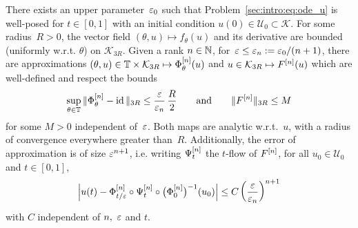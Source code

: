 \begin{assumption} \label{hyp:exist_avg_nl} %
  There exists an upper parameter~$\varepsilon_0$ such that
  Problem~\eqref{sec:intro:eq:ode_u} is well-posed for $t \in [0,1]$
  with an initial condition $u(0) \in \mathcal{U}_0 \subset
  \mathcal{K}$. For some radius~$R > 0$, the vector field $(\theta ,
  u) \mapsto f_\theta(u)$ and its derivative are bounded (uniformly
  w.r.t. $\theta$) on $\mathcal{K}_{3R}$. Given a rank $n \in \mathbb{N}$,
  for~$\varepsilon \leq \varepsilon_n := \varepsilon_0 / (n+1)$, there are approximations
  $(\theta, u) \in \mathbb{T} \times \mathcal{K}_{3R} \mapsto \Phi^{[n]}_\theta
  (u)$ and $u \in \mathcal{K}_{3R} \mapsto F^{[n]} (u)$ which are
  well-defined and respect the bounds
  \begin{equation*}
    \sup_{\theta \in \mathbb{T}} \| \Phi^{[n]}_\theta - \operatorname{id} \| _{3R} 
      \leq \frac{\varepsilon}{\varepsilon_n}\, \frac R 2
    \qquad\text{and}\qquad
    \| F^{[n]} \|_{3R} \leq M 
  \end{equation*}
  for some $M > 0$ independent of~$\varepsilon$. Both maps are analytic
  w.r.t.~$u$, with a radius of convergence everywhere greater than~$R$.
  Additionally, the error of approximation is of size $\varepsilon^{n+1}$, i.e.
  writing $\Psi^{[n]} _t$ the $t$-flow of $F^{[n]}$, for all $u_0 \in
  \mathcal{U}_0$ and $t \in [0,1]$, 
  \begin{equation} \label{sec:approx:def:avg_approx}
    \left| u(t) - \Phi^{[n]} _{t/\varepsilon} \circ \Psi^{[n]} _t \circ \big( \Phi^{[n]} _0
    \big)^{-1} (u_0) \right| 
    \leq  C \left( \frac{\varepsilon}{\varepsilon_n}\right)^{n+1} 
  \end{equation}
  with $C$ independent of $n,\ \varepsilon$ and $t$.
\end{assumption}

